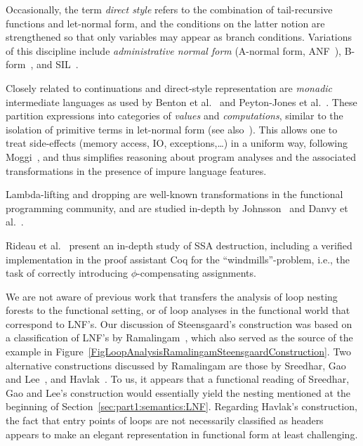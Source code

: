 {%

Occasionally, the term \emph{direct style} refers to the combination
of tail-recursive functions and let-normal form, and the conditions on
the latter notion are strengthened so that only variables may appear
as branch conditions. Variations of this discipline include
\emph{administrative normal form} (A-normal form,
ANF~\cite{DBLP:conf/pldi/FlanaganSDF93}),
B-form~\cite{DBLP:conf/pldi/TarditiMCSHL96}, and
SIL~\cite{DBLP:journals/jfp/TolmachO98}.

Closely related to continuations and direct-style representation are
\emph{monadic} intermediate languages as used by Benton et
al.~\cite{BentonKennedyRussel:ICFP1998} and Peyton-Jones et
al.~\cite{PeytonJonesShieldsLT:POPL1998}. These partition expressions
into categories of \emph{values} and
\emph{computations}, similar to the isolation of primitive terms in
let-normal form (see also~\cite{Reynolds1974,Plotkin75}). This allows
one to treat side-effects (memory access, IO, exceptions,\ldots) in a
uniform way, following Moggi~\cite{Moggi1991}, and thus simplifies
reasoning about program analyses and the associated transformations in
the presence of impure language features.

Lambda-lifting and dropping are well-known transformations in the
functional programming community, and are studied in-depth by
Johnsson~\cite{DBLP:conf/fpca/Johnsson85} and Danvy et
al.~\cite{DBLP:journals/tcs/DanvyS00}.

Rideau et al.~\cite{DBLP:journals/jar/RideauSL08} present an in-depth
study of SSA destruction, including a verified implementation in the
proof assistant Coq for the ``windmills''-problem, i.e., the task of
correctly introducing $\phi$-compensating assignments.

We are not aware of previous work that transfers the analysis of loop
nesting forests to the functional setting, or of loop analyses in the
functional world that correspond to LNF's.  Our discussion of
Steensgaard's construction was based on a classification of LNF's by
Ramalingam~\cite{DBLP:journals/toplas/Ramalingam02}, which also served
as the source of the example in
Figure~\ref{FigLoopAnalysisRamalingamSteensgaardConstruction}.  Two
alternative constructions discussed by Ramalingam are those by
Sreedhar, Gao and Lee~\cite{DBLP:journals/toplas/SreedharGL96}, and
Havlak~\cite{DBLP:journals/toplas/Havlak97}.  To us, it appears that a
functional reading of Sreedhar, Gao and Lee's construction would
essentially yield the nesting mentioned at the beginning of
Section~\ref{sec:part1:semantics:LNF}. Regarding Havlak's
construction, the fact that entry points of loops are not necessarily
classified as headers appears to make an elegant representation in
functional form at least challenging.

}
